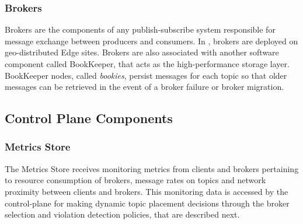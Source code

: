\subsubsection{Brokers}
Brokers are the components of any publish-subscribe system responsible for message exchange between producers and consumers. In \epulsar, brokers are deployed on geo-distributed Edge sites. Brokers are also associated with another software component called BookKeeper, that acts as the high-performance storage layer. BookKeeper nodes, called \textit{bookies}, persist messages for each topic so that older messages can be retrieved in the event of a broker failure or broker migration.
\subsection{Control Plane Components}
\subsubsection{Metrics Store}
The Metrics Store receives monitoring metrics from clients and brokers pertaining to resource consumption of brokers, message rates on topics and network proximity between clients and brokers. This monitoring data is accessed by the control-plane for making dynamic topic placement decisions through the broker selection and violation detection policies, that are described next.

